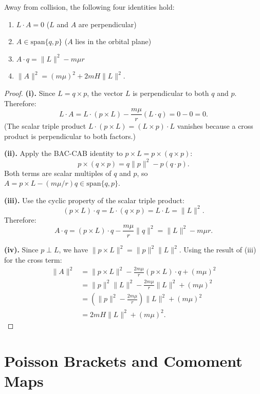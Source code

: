 \begin{proposition}\label{thm:basic-identities}
Away from collision, the following four identities hold:
\begin{enumerate}
  \item[\textup{(i)}] $L \cdot A = 0$ \quad ($L$ and $A$ are perpendicular)
  \item[\textup{(ii)}] $A \in \mathrm{span}\{q, p\}$ \quad ($A$ lies in the orbital plane)
  \item[\textup{(iii)}] $A \cdot q = \|L\|^2 - m\mu r$
  \item[\textup{(iv)}] $\|A\|^2 = (m\mu)^2 + 2mH\|L\|^2$.
\end{enumerate}
\leanok
\begin{proof}
\textbf{(i).}
Since $L = q \times p$, the vector $L$ is perpendicular to both $q$ and $p$.
Therefore:
\[
  L \cdot A = L \cdot (p \times L) - \frac{m\mu}{r}(L \cdot q) = 0 - 0 = 0.
\]
(The scalar triple product $L \cdot (p \times L) = (L \times p) \cdot L$ vanishes because a cross product is perpendicular to both factors.)

\textbf{(ii).}
Apply the BAC-CAB identity to $p \times L = p \times (q \times p)$:
\[
  p \times (q \times p) = q\|p\|^2 - p(q \cdot p).
\]
Both terms are scalar multiples of $q$ and $p$, so $A = p \times L - (m\mu/r)q \in \mathrm{span}\{q, p\}$.

\textbf{(iii).}
Use the cyclic property of the scalar triple product:
\[
  (p \times L) \cdot q = L \cdot (q \times p) = L \cdot L = \|L\|^2.
\]
Therefore:
\[
  A \cdot q = (p \times L) \cdot q - \frac{m\mu}{r}\|q\|^2 = \|L\|^2 - m\mu r.
\]

\textbf{(iv).}
Since $p \perp L$, we have $\|p \times L\|^2 = \|p\|^2\|L\|^2$.
Using the result of (iii) for the cross term:
\begin{align*}
  \|A\|^2
  &= \|p \times L\|^2 - \frac{2m\mu}{r}(p \times L) \cdot q + (m\mu)^2 \\
  &= \|p\|^2\|L\|^2 - \frac{2m\mu}{r}\|L\|^2 + (m\mu)^2 \\
  &= \left(\|p\|^2 - \frac{2m\mu}{r}\right)\|L\|^2 + (m\mu)^2 \\
  &= 2mH\|L\|^2 + (m\mu)^2.
\end{align*}
\end{proof}
\end{proposition}

\chapter{Poisson Brackets and Comoment Maps}\label{ch:poisson}

